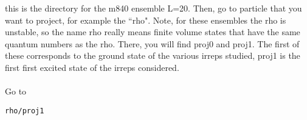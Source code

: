 \documentclass[prd,showpacs,showkeys,preprintnumbers,floatfix,
nofootinbib,superscriptaddress]{revtex4}
\begin{document}
\normalsize
this is the directory for the m840 ensemble L=20. Then, go to particle that you want to project, for example the ``rho".  Note, for these ensembles the rho is unstable, so the name rho really means finite volume states that have the same quantum numbers as the rho. There, you will find proj0 and proj1. The first of these corresponds to the ground state of the various irreps studied, proj1 is the first first excited state of the irreps considered.
\\
\\
\indent
Go to  
\footnotesize
\begin{verbatim}
rho/proj1
\end{verbatim} 
\normalsize
\end{document}
